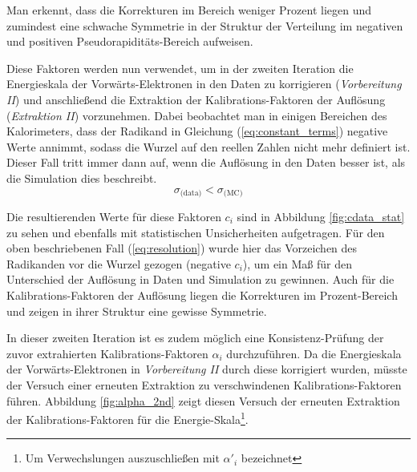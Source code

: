 Man erkennt, dass die Korrekturen im Bereich weniger Prozent liegen und
zumindest eine schwache Symmetrie in der Struktur der Verteilung im negativen
und positiven Pseudorapiditäts-Bereich aufweisen.

Diese Faktoren werden nun verwendet, um in der zweiten Iteration die
Energieskala der Vorwärts-Elektronen in den Daten zu korrigieren
(\textit{Vorbereitung II}) und anschließend die Extraktion der
Kalibrations-Faktoren der Auflösung (\textit{Extraktion II}) vorzunehmen.
Dabei beobachtet man in einigen Bereichen des Kalorimeters, dass der Radikand
in Gleichung (\ref{eq:constant_terms}) negative Werte annimmt, sodass die
Wurzel auf den reellen Zahlen nicht mehr definiert ist. Dieser Fall tritt immer
dann auf, wenn die Auflösung in den Daten besser ist, als die Simulation dies
beschreibt.
\begin{equation}
    \sigma_\text{(data)} < \sigma_\text{(MC)}
    \label{eq:resolution}
\end{equation}

Die resultierenden Werte für diese Faktoren $c_i$ sind in Abbildung
\ref{fig:cdata_stat} zu sehen und ebenfalls mit statistischen Unsicherheiten
aufgetragen. Für den oben beschriebenen Fall (\ref{eq:resolution}) wurde hier
das Vorzeichen des Radikanden vor die Wurzel gezogen (negative $c_i$), um ein
Maß für den Unterschied der Auflösung in Daten und Simulation zu gewinnen. Auch
für die Kalibrations-Faktoren der Auflösung liegen die Korrekturen im
Prozent-Bereich und zeigen in ihrer Struktur eine gewisse Symmetrie.

In dieser zweiten Iteration ist es zudem möglich eine Konsistenz-Prüfung der
zuvor extrahierten Kalibrations-Faktoren $\alpha_i$ durchzuführen. Da die
Energieskala der Vorwärts-Elektronen in \textit{Vorbereitung II} durch diese
korrigiert wurden, müsste der Versuch einer erneuten Extraktion zu
verschwindenen Kalibrations-Faktoren führen. Abbildung \ref{fig:alpha_2nd}
zeigt diesen Versuch der erneuten Extraktion der Kalibrations-Faktoren für die
Energie-Skala\footnote{Um Verwechslungen auszuschließen mit $\alpha'_i$
bezeichnet}.

